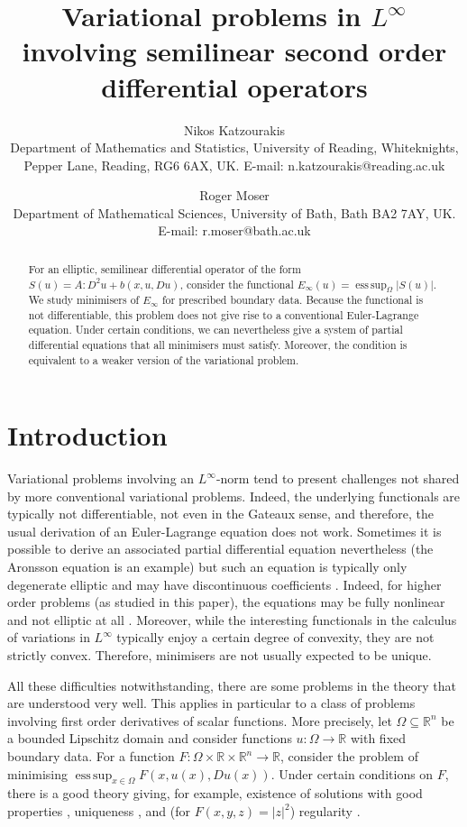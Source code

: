 \documentclass[a4paper]{article}
\title{Variational problems in $L^\infty$ involving semilinear second order differential operators}
\author{Nikos Katzourakis \\ \small Department of Mathematics and Statistics, University of Reading, Whiteknights, Pepper Lane, Reading, RG6 6AX, UK. E-mail: n.katzourakis@reading.ac.uk
\and Roger Moser \\ \small Department of Mathematical Sciences,
University of Bath, Bath BA2 7AY, UK.
E-mail: r.moser@bath.ac.uk}
\newcommand{\R}{\mathbb{R}}
\DeclareMathOperator*{\esssup}{ess\,sup}
\theoremstyle{remark}
\begin{document}
\maketitle

\begin{abstract}
For an elliptic, semilinear differential operator of the form $S(u) = A : D^2 u + b(x, u , Du)$,
consider the functional $E_\infty(u) = \esssup_\Omega |S(u)|$.
We study minimisers of $E_\infty$ for prescribed boundary data. Because the functional is not differentiable,
this problem does not give rise to a conventional Euler-Lagrange equation. Under certain conditions,
we can nevertheless give a system of partial differential equations that all minimisers must
satisfy. Moreover, the condition is equivalent to a weaker version of the variational problem.
\end{abstract}


\section{Introduction}

Variational problems involving an $L^\infty$-norm tend to present challenges
not shared by more conventional variational problems. Indeed, the underlying
functionals are typically not differentiable, not even in the Gateaux sense,
and therefore, the usual derivation of an Euler-Lagrange equation does not
work. Sometimes it is possible to derive an associated partial differential
equation nevertheless (the Aronsson equation \cite{Aronsson:68} is an example) but such
an equation is typically only degenerate elliptic and may have
discontinuous coefficients \cite{Katzourakis:12}. Indeed, for higher order problems (as
studied in this paper), the equations may be fully nonlinear and
not elliptic at all \cite{Katzourakis-Pryer:20}. Moreover, while the
interesting functionals in the calculus
of variations in $L^\infty$ typically enjoy a certain degree of convexity,
they are not strictly convex. Therefore, minimisers are not
usually expected to be unique.

All these difficulties notwithstanding, there are some problems in the theory
that are understood very well. This applies in particular to a class
of problems involving first order derivatives of scalar functions.
More precisely, let $\Omega \subseteq \R^n$ be a bounded Lipschitz domain
and consider functions $u \colon \Omega \to \R$ with fixed boundary data.
For a function $F \colon \Omega \times \R \times \R^n \to \R$, consider the
problem of minimising $\esssup_{x \in \Omega} F(x, u(x), Du(x))$.
Under certain conditions on $F$, there is a good theory giving, for
example, existence of solutions with good properties
\cite{Aronsson:67, Barron-Jensen-Wang:01.1, Barron-Jensen-Wang:01.2},
uniqueness \cite{Jensen:93, Juutinen:98}, and (for $F(x, y, z) = |z|^2$)
regularity \cite{Evans-Savin:08, Evans-Smart:11.1, Evans-Smart:11.2}.
\end{document}
